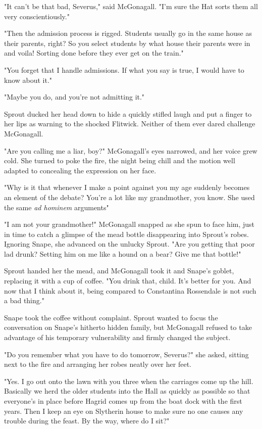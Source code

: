 "It can't be that bad, Severus," said McGonagall. "I'm sure the Hat sorts them all very conscientiously."

"Then the admission process is rigged. Students usually go in the same house as their parents, right? So you select students by what house their parents were in and voila! Sorting done before they ever get on the train."

"You forget that I handle admissions. If what you say is true, I would have to know about it."

"Maybe you do, and you're not admitting it."

Sprout ducked her head down to hide a quickly stifled laugh and put a finger to her lips as warning to the shocked Flitwick. Neither of them ever dared challenge McGonagall.

"Are you calling me a liar, boy?" McGonagall's eyes narrowed, and her voice grew cold. She turned to poke the fire, the night being chill and the motion well adapted to concealing the expression on her face.

"Why is it that whenever I make a point against you my age suddenly becomes an element of the debate? You're a lot like my grandmother, you know. She used the same \emph{ad hominem} arguments{\el}"

"I am not your grandmother!" McGonagall snapped as she spun to face him, just in time to catch a glimpse of the mead bottle disappearing into Sprout's robes. Ignoring Snape, she advanced on the unlucky Sprout. "Are you getting that poor lad drunk? Setting him on me like a hound on a bear? Give me that bottle!"

Sprout handed her the mead, and McGonagall took it and Snape's goblet, replacing it with a cup of coffee. "You drink that, child. It's better for you. And now that I think about it, being compared to Constantina Rossendale is not such a bad thing."

Snape took the coffee without complaint. Sprout wanted to focus the conversation on Snape's hitherto hidden family, but McGonagall refused to take advantage of his temporary vulnerability and firmly changed the subject.

"Do you remember what you have to do tomorrow, Severus?" she asked, sitting next to the fire and arranging her robes neatly over her feet.

"Yes. I go out onto the lawn with you three when the carriages come up the hill. Basically we herd the older students into the Hall as quickly as possible so that everyone's in place before Hagrid comes up from the boat dock with the first years. Then I keep an eye on Slytherin house to make sure no one causes any trouble during the feast. By the way, where do I sit?"

